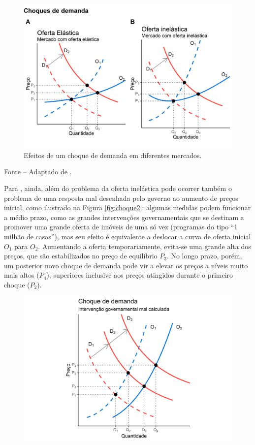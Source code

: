\documentclass[
	12pt,				%
	oneside,			%
	a4paper,			%
	chapter=TITLE,		%
	section=TITLE,		%
	english,			%
	brazil				%
	]{abntex2}
\newcommand{\bcenter}{\begin{center}}
\newcommand{\ecenter}{\end{center}}
\begin{document}
\begin{refsection}
\begin{figure}[H]
{\centering \includegraphics[width=1\linewidth]{images/choque-1} 

}

\caption{Efeitos de um choque de demanda em diferentes mercados.}\label{fig:choque}
\end{figure}
\bcenter

\small Fonte -- Adaptado de \textcite[p.~19]{Malpezzi2002TheRO}.
\ecenter

Para \textcite[p.~11]{regulation}, ainda, além do problema da oferta inelástica pode
ocorrer também o problema de uma resposta mal desenhada pelo governo ao aumento
de preços inicial, como ilustrado na Figura \ref{fig:choque2}: algumas medidas
podem funcionar a médio prazo, como as grandes intervenções governamentais que
se destinam a promover uma grande oferta de imóveis de uma só vez (programas do
tipo ``1 milhão de casas''), mas seu efeito é equivalente a deslocar a curva de
oferta inicial \(O_1\) para \(O_2\). Aumentando a oferta temporariamente, evita-se
uma grande alta dos preços, que são estabilizados no preço de equilíbrio \(P_3\).
No longo prazo, porém, um posterior novo choque de demanda pode vir a elevar os
preços a níveis muito mais altos (\(P_4\)), superiores inclusive aos preços
atingidos durante o primeiro choque (\(P_2\)).
\begin{figure}[H]

{\centering \includegraphics[width=0.7\linewidth]{images/choque2-1} 

}
\end{figure}
\end{refsection}
\end{document}
